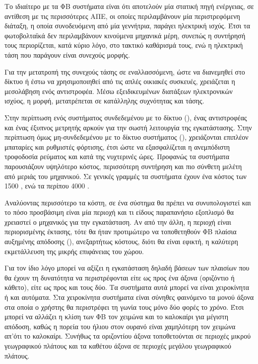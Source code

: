 \documentclass[12pt]{report}
\begin{document}
Το ιδιαίτερο με τα ΦΒ συστήματα είναι ότι αποτελούν μία στατική πηγή ενέργειας, σε αντίθεση με τις περισσότερες ΑΠΕ, οι οποίες περιλαμβάνουν μία περιστρεφόμενη διάταξη, η οποία συνοδευόμενη από μία γεννήτρια, παράγει ηλεκτρική
ισχύς. Έτσι τα φωτοβολταϊκά δεν περιλαμβάνουν κινούμενα μηχανικά μέρη, συνεπώς η συντήρησή τους περιορίζεται, κατά κύριο λόγο, στο τακτικό καθάρισμά τους, ενώ η ηλεκτρική τάση που παράγουν είναι συνεχούς μορφής.

Για την μετατροπή της συνεχούς τάσης σε εναλλασσόμενη, ώστε να διανεμηθεί στο δίκτυο ή έστω να χρησιμοποιηθεί από τις απλές οικιακές συσκευές, χρειάζεται η μεσολάβηση ενός αντιστροφέα. Μέσω εξειδικευμένων διατάξεων ηλεκτρονικών
ισχύος, η {} μορφή, μετατρέπεται σε {} κατάλληλης συχνότητας και τάσης. 

Στην περίπτωση ενός συστήματος συνδεδεμένου με το δίκτυο ({}), ένας αντιστροφέας και ένας έξυπνος μετρητής αρκούν για την σωστή λειτουργία της εγκατάστασης. Στην περίπτωση όμως μη-συνδεδεμένου με το δίκτυο
συστήματος ({}), χρειάζονται επιπλέον μπαταρίες και ρυθμιστές φόρτισης, έτσι ώστε να εξασφαλίζεται η ανεμπόδιστη τροφοδοσία ρεύματος και κατά της νυχτερινές ώρες. Προφανώς τα {}
συστήματα παρουσιάζουν υψηλότερο κόστος, περισσότερη συντήρηση και πιο σύνθετη μελέτη από μεριάς του μηχανικού. Σε γενικές γραμμές τα {} συστήματα έχουν ένα κόστος των 1500 {}, ενώ τα 
{} περίπου 4000 {}.

Αναλύοντας περισσότερο τα κόστη, σε ένα σύστημα θα πρέπει να συνυπολογιστεί και το πόσο προσβάσιμη είναι μία περιοχή και τι είδους παραπανήσιο εξοπλισμό θα χρειαστεί ο μηχανικός για την εγκατάσταση. 
Αν από την άλλη, η περιοχή είναι περιορισμένης έκτασης, τότε θα ήταν προτιμώτερο να τοποθετηθούν ΦΒ πλαίσια αυξημένης απόδοσης ({}), ανεξαρτήτως κόστους, διότι θα είναι εφικτή, η καλύτερη εκμετάλλευση 
της μικρής επιφάνειας του χώρου. 

Για τον ίδιο λόγο μπορεί να αξίζει η εγκατάσταση {} δηλαδή βάσεων των πλαισίων που θα έχουν τη δυνατότητα να περιστρέφονται είτε ως προς ένα άξονα (οριζόντιο ή κάθετο), είτε ως προς και τους δύο.
Τα συστήματα αυτά μπορεί να είναι χειροκίνητα ή και αυτόματα. Στα χειροκίνητα συστήματα είναι σύνηθες φαινόμενο τα {} μονού άξονα στα οποία ο χρήστης θα περιστρέφει τη γωνία τους μόνο δύο φορές το χρόνο.
Έτσι μπορεί να αλλάζει η κλίση των ΦΒ τον χειμώνα και το καλοκαίρι για μέγιστη απόδοση, καθώς η πορεία του ήλιου στον ουρανό είναι χαμηλότερη τον χειμώνα απ'ότι το καλοκαίρι. Συνήθως τα {} οριζοντίου άξονα
τοποθετούνται σε περιοχές μικρού γεωγραφικού πλάτους και τα {} καθέτου άξονα σε περιοχές μεγάλου γεωγραφικού πλάτους.
\end{document}

